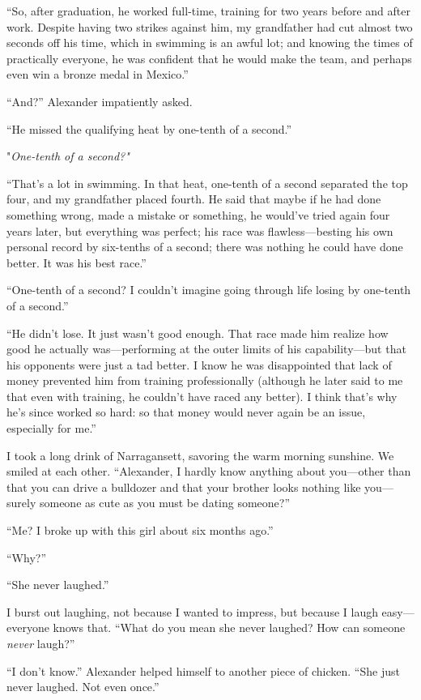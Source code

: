 ``So, after graduation, he worked full-time, training for two years
before and after work. Despite having two strikes against him, my
grandfather had cut almost two seconds off his time, which in swimming
is an awful lot; and knowing the times of practically everyone, he was
confident that he would make the team, and perhaps even win a bronze
medal in Mexico.''

``And?'' Alexander impatiently asked.

``He missed the qualifying heat by one-tenth of a second.''

"\emph{One-tenth of a second?"}

``That's a lot in swimming. In that heat, one-tenth of a second
separated the top four, and my grandfather placed fourth. He said that
maybe if he had done something wrong, made a mistake or something, he
would've tried again four years later, but everything was perfect; his
race was flawless---besting his own personal record by six-tenths of a
second; there was nothing he could have done better. It was his best
race.''

``One-tenth of a second? I couldn't imagine going through life losing by
one-tenth of a second.''

``He didn't lose. It just wasn't good enough. That race made him realize
how good he actually was---performing at the outer limits of his
capability---but that his opponents were just a tad better. I know he
was disappointed that lack of money prevented him from training
professionally (although he later said to me that even with training, he
couldn't have raced any better). I think that's why he's since worked so
hard: so that money would never again be an issue, especially for me.''

I took a long drink of Narragansett, savoring the warm morning sunshine.
We smiled at each other. ``Alexander, I hardly know anything about
you---other than that you can drive a bulldozer and that your brother
looks nothing like you---surely someone as cute as you must be dating
someone?''

``Me? I broke up with this girl about six months ago.''

``Why?''

``She never laughed.''

I burst out laughing, not because I wanted to impress, but because I
laugh easy---everyone knows that. ``What do you mean she never laughed?
How can someone \emph{never} laugh?''

``I don't know.'' Alexander helped himself to another piece of chicken.
``She just never laughed. Not even once.''

